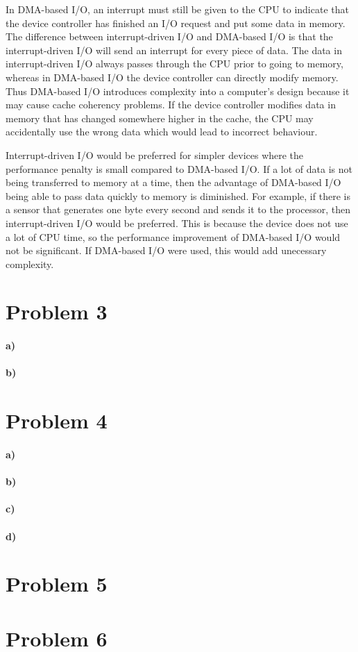\documentclass[12pt]{article}
\begin{document}
In DMA-based I/O, an interrupt must still be given to the CPU to indicate that the device controller has finished an I/O request and put some data in memory.
The difference between interrupt-driven I/O and DMA-based I/O is that the interrupt-driven I/O will send an interrupt for every piece of data. The data in
interrupt-driven I/O always passes through the CPU prior to going to memory, whereas in DMA-based I/O the device controller can directly modify memory.
Thus DMA-based I/O introduces complexity into a computer's design because it may cause cache coherency problems. If the device controller modifies data in memory
that has changed somewhere higher in the cache, the CPU may accidentally use the wrong data which would lead to incorrect behaviour.

Interrupt-driven I/O would be preferred for simpler devices where the performance penalty is small compared to DMA-based I/O. If a lot of data is not being transferred
to memory at a time, then the advantage of DMA-based I/O being able to pass data quickly to memory is diminished. For example, if there is a sensor that generates one byte
every second and sends it to the processor, then interrupt-driven I/O would be preferred. This is because the device does not use a lot of CPU time, so the performance improvement
of DMA-based I/O would not be significant. If DMA-based I/O were used, this would add unecessary complexity.

\section*{Problem 3}

\paragraph{a)}

\paragraph{b)}

\section*{Problem 4}

\paragraph{a)}

\paragraph{b)}

\paragraph{c)}

\paragraph{d)}

\section*{Problem 5}

\section*{Problem 6}
\end{document}
